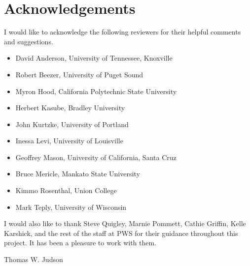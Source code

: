  
 

 
 
 
 
 
 
 
 
 
 
 
 

 
\section*{Acknowledgements}
 
 
I would like to acknowledge the following reviewers for their helpful
comments and suggestions. 
\begin{itemize}
 
\item
David Anderson,
University of Tennessee, Knoxville

\item
Robert Beezer,
University of Puget Sound

\item
Myron Hood,
California Polytechnic State University

\item
Herbert Kasube,
Bradley University

\item
John Kurtzke,
University of Portland
 
\item
Inessa Levi,
University of Louisville
 
\item
Geoffrey Mason,
University of California, Santa Cruz

\item
Bruce Mericle,
Mankato State University
 
\item
Kimmo Rosenthal,
Union College

\item
Mark Teply,
University of Wisconsin

\end{itemize}
I would also like to thank Steve Quigley, Marnie Pommett, Cathie
Griffin, Kelle Karshick, and the rest of the staff at PWS for their
guidance throughout this project. It has been a pleasure to work with
them. 

 
\begin{flushright}
Thomas W. Judson
\end{flushright}
 
 
\pagestyle{headings}
 
 
 
 
